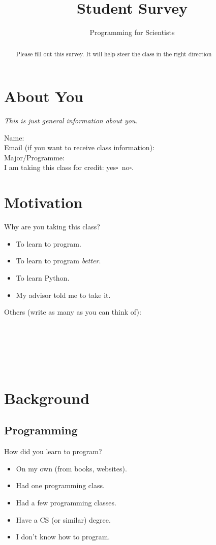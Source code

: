 \documentclass[article,twoside]{memoir}
\title{Student Survey}
\author{Programming for Scientists}
\newcommand*{\fillunderscore}{~\hrulefill}
\newcommand*{\checkbox}{$\square$}
\newcommand*{\yesno}{\hfill\mbox{yes\checkbox~no\checkbox}}
\newcommand{\header}[1]{\textsl{#1}\par\medskip}
\begin{document}
\maketitle
\begin{abstract}
Please fill out this survey. It will help steer the class in the right direction
\end{abstract}

\chapter{About You}

\header{This is just general information about you.}

\noindent Name: \fillunderscore\\
Email (if you want to receive class information): \fillunderscore\\
Major/Programme: \fillunderscore\\
I am taking this class for credit: \yesno.

\chapter{Motivation}

Why are you taking this class?
\begin{itemize}[\checkbox]
\item To learn to program.
\item To learn to program \emph{better}.
\item To learn Python.
\item My advisor told me to take it.
\end{itemize}

Others (write as many as you can think of): \fillunderscore\par
\fillunderscore\par
\fillunderscore\par
\fillunderscore

\chapter{Background}

\section{Programming}

How did you learn to program?
\begin{itemize}[\checkbox]
\item On my own (from books, websites).
\item Had one programming class.
\item Had a few programming classes.
\item Have a CS (or similar) degree.
\item I don't know how to program.
\end{itemize}
\end{document}
